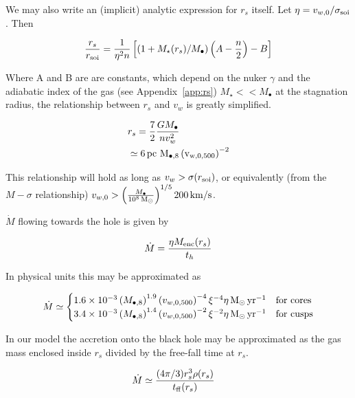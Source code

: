 \documentclass[usenatbib,fleqn]{mn2e}
\newcommand{\Mdot}{\dot{M}}
\newcommand{\rs}{r_s}
\newcommand{\vw}{v_w}
\newcommand{\pc}{\rm pc}
\newcommand{\Menc}{M_{\rm enc}}
\newcommand{\Mstar}{M_{\star}}
\newcommand{\Mbh}[1][]{M_{\bullet#1}}
\newcommand{\Mbheight}{M_{\bullet,8}}
\newcommand{\soi}{\rm soi}
\newcommand{\rsoi}{r_{\soi}}
\newcommand{\ff}{\rm ff}
\newcommand{\vwO}{v_{w,0}}
\newcommand{\x}{\frac{r_s}{\rsoi}}
\newcommand{\vwOFH}{v_{w,0,500}}
\newcommand{\pyear}{{\rm yr}^{-1}}
\renewcommand{\th}{t_h}
\begin{document}
We may also write an (implicit) analytic expression for $\rs$
itself. Let  $\eta=v_{w,0}/\sigma_{\rm soi}$. Then 


\begin{align}
  \x=\frac{1}{\eta^2 n}\left[ (1+\Mstar(\rs)/\Mbh)\left(A-\frac{n}{2}\right)-B\right]
  \label{eq:stag_analytic}
\end{align}

Where A and B are are constants, which depend on the nuker $\gamma$
and the adiabatic index of the gas (see Appendix~\ref{app:rs})  $\Mstar << \Mbh$ at the stagnation radius, the relationship between $\rs$ and $\vw$ is greatly simplified. 

\begin{align}
  &\rs=\frac{7}{2}\frac{G \Mbh}{n \vw^2}\\
  &\simeq 6 \, \pc \,\, \Mbheight \left(\vwOFH\right)^{-2}
  \label{eq:stag_simple}
\end{align}

This relationship will hold as long as $\vw > \sigma(\rsoi)$, or equivalently (from the $M-\sigma$ relationship) $\vwO > \left(\frac{\Mbh}{10^8 \Msun}\right)^{1/5} 200 {\rm \, km/s}$.

$\Mdot$ flowing towards the hole is given by

\begin{align}
  \dot{M}=\frac{\eta \Menc(\rs)}{\th}
\end{align}

In physical units this may be approximated as 

\begin{align}
  \dot{M}\simeq
  \begin{cases}
    1.6 \times 10^{-3}  \left(\Mbheight\right)^{1.9}
    \left(\vwOFH\right)^{-4} \xi^{-4} \eta \Msun \, \pyear& \text{for cores} \\
    3.4 \times 10^{-3} \left(\Mbheight\right)^{1.4}
    \left(\vwOFH\right)^{-2} \xi^{-2} \eta \Msun \, \pyear  & \text{for cusps} 
  \end{cases}
  \label{eq:mdot_analytic}
\end{align}

In our model the accretion onto the black hole may be approximated as
the gas mass enclosed inside $\rs$ divided by the free-fall time at $\rs$.

\begin{align}
  &\dot{M}\simeq\frac{(4 \pi/3) \rs^3 \rho(\rs)}{t_{\ff}(\rs)}
  \label{eq:mdot_gas}
\end{align}
\end{document}
